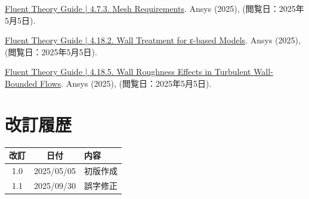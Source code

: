 \documentclass[uplatex,dvipdfmx,a4j,12pt]{jsarticle}
\begin{document}
\begin{thebibliography}{9}
    \href{https://ansyshelp.ansys.com/public///Views/Secured/corp/v251/en/flu_th/flu_th_sec_turb_sst_grid.html}{Fluent Theory Guide | 4.7.3. Mesh Requirements}. Ansys (2025), (閲覧日：2025年5月5日).

    \href{https://ansyshelp.ansys.com/public//Views/Secured/corp/v251/en/flu_th/ch04s18s02.html}{Fluent Theory Guide | 4.18.2. Wall Treatment for ε-based Models}. Ansys (2025), (閲覧日：2025年5月5日).
  
    \href{https://ansyshelp.ansys.com/public//Views/Secured/corp/v251/en/flu_th/x1-5720008.164.html}{Fluent Theory Guide | 4.18.5. Wall Roughness Effects in Turbulent Wall-Bounded Flows}. Ansys (2025), (閲覧日：2025年5月5日).
  
\end{thebibliography}

\section*{改訂履歴}

\begin{table}[H]
  \centering
  \begin{tabular}{c|c|l}
    \hline
    改訂 & 日付 & 内容 \\
    \hline\hline
    1.0 & 2025/05/05 & 初版作成 \\
    1.1 & 2025/09/30 & 誤字修正 \\
    \hline
  \end{tabular}
\end{table}
\end{document}

